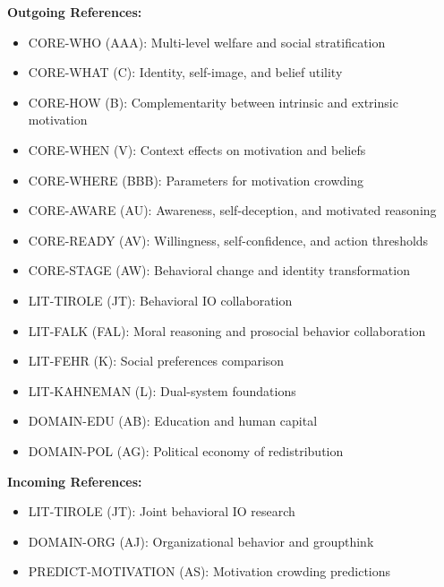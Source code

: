\begin{tcolorbox}[colback=blue!5!white,colframe=blue!75!black,title=Cross-Reference Map]
\textbf{Outgoing References:}
\begin{itemize}
    \item CORE-WHO (AAA): Multi-level welfare and social stratification
    \item CORE-WHAT (C): Identity, self-image, and belief utility
    \item CORE-HOW (B): Complementarity between intrinsic and extrinsic motivation
    \item CORE-WHEN (V): Context effects on motivation and beliefs
    \item CORE-WHERE (BBB): Parameters for motivation crowding
    \item CORE-AWARE (AU): Awareness, self-deception, and motivated reasoning
    \item CORE-READY (AV): Willingness, self-confidence, and action thresholds
    \item CORE-STAGE (AW): Behavioral change and identity transformation
    \item LIT-TIROLE (JT): Behavioral IO collaboration
    \item LIT-FALK (FAL): Moral reasoning and prosocial behavior collaboration
    \item LIT-FEHR (K): Social preferences comparison
    \item LIT-KAHNEMAN (L): Dual-system foundations
    \item DOMAIN-EDU (AB): Education and human capital
    \item DOMAIN-POL (AG): Political economy of redistribution
\end{itemize}

\textbf{Incoming References:}
\begin{itemize}
    \item LIT-TIROLE (JT): Joint behavioral IO research
    \item DOMAIN-ORG (AJ): Organizational behavior and groupthink
    \item PREDICT-MOTIVATION (AS): Motivation crowding predictions
\end{itemize}
\end{tcolorbox}

